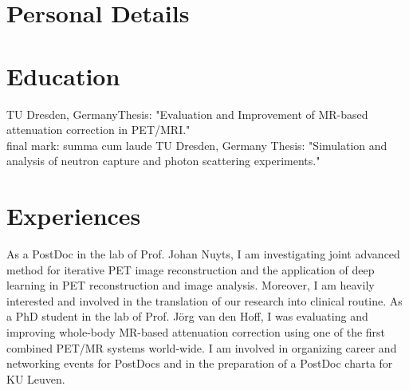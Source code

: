 \documentclass[10pt,a4paper,sans]{moderncv}   %
\begin{document}
%

\maketitle

\section{Personal Details}


\section{Education}
        {}{}{TU Dresden, Germany}{Thesis: "Evaluation and Improvement of MR-based attenuation 
                                  correction in PET/MRI." \\ final mark: summa cum laude}
        {}{}{TU Dresden, Germany}
        {Thesis: "Simulation and analysis of neutron capture and photon scattering experiments."}


\section{Experiences}
        {}
        {As a PostDoc in the lab of Prof. Johan Nuyts, I am investigating
        joint advanced method for iterative PET image reconstruction and the application
        of deep learning in PET reconstruction and image analysis.
        Moreover, I am heavily interested and involved in the translation of our research
        into clinical routine.}
        {}{}
        {}
        {As a PhD student in the lab of Prof. J\"org van den Hoff, I was evaluating
         and improving whole-body MR-based attenuation correction using one of
         the first combined PET/MR systems world-wide.}
        {I am involved in organizing career and networking events for PostDocs and
         in the preparation of a PostDoc charta for KU Leuven.}
\end{document}

